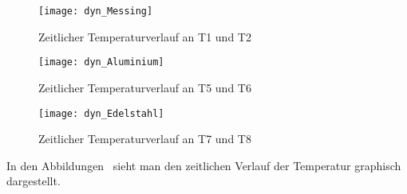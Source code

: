 \begin{figure}
  \centering
  \texttt{[image: dyn\_Messing]}
  \caption{Zeitlicher Temperaturverlauf an T1 und T2}
  \label{fig:dyn_messing}
\end{figure}

\begin{figure}
  \centering
  \texttt{[image: dyn\_Aluminium]}
  \caption{Zeitlicher Temperaturverlauf an T5 und T6}
  \label{fig:dyn_aluminium}
\end{figure}

\begin{figure}
  \centering
  \texttt{[image: dyn\_Edelstahl]}
  \caption{Zeitlicher Temperaturverlauf an T7 und T8}
  \label{fig:dyn_edelstahl}
\end{figure}

In den Abbildungen~ sieht
man den zeitlichen Verlauf der Temperatur graphisch dargestellt.
